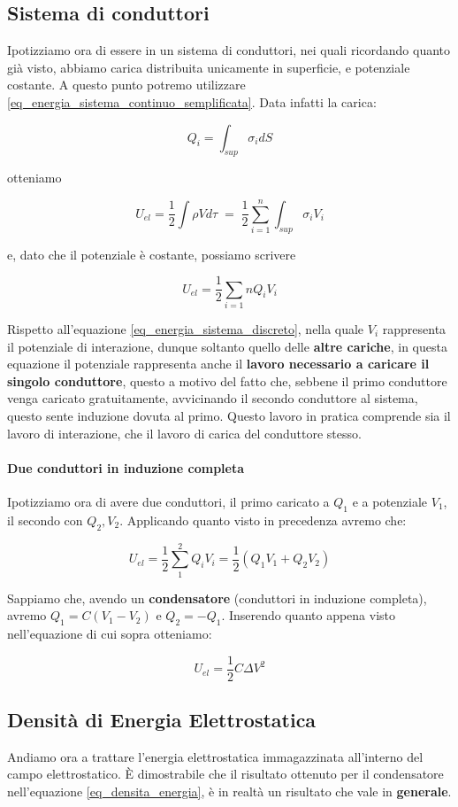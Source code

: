 \subsection{Sistema di conduttori}
Ipotizziamo ora di essere in un sistema di conduttori, nei quali ricordando quanto già visto, abbiamo carica distribuita unicamente in superficie, e potenziale costante. A questo punto potremo utilizzare \ref{eq_energia_sistema_continuo_semplificata}. Data infatti la carica: 

$$ Q_i = \int_{sup} \sigma_i dS $$ 

otteniamo

$$
	U_{el} = \frac{1}{2} \int \rho V d\tau \; = \; \frac{1}{2} \sum_{i=1}^n \int_{sup} \sigma_i V_i
$$

e, dato che il potenziale è costante, possiamo scrivere

\begin{equation} \label{eq_energia_sistema_conduttori}
	U_{el} = \frac{1}{2} \sum_{i=1}{n} Q_i V_i
\end{equation}

Rispetto all'equazione \ref{eq_energia_sistema_discreto}, nella quale $V_i$ rappresenta il potenziale di interazione, dunque soltanto quello delle \textbf{altre cariche}, in questa equazione il potenziale rappresenta anche il \textbf{lavoro necessario a caricare il singolo conduttore}, questo a motivo del fatto che, sebbene il primo conduttore venga caricato gratuitamente, avvicinando il secondo conduttore al sistema, questo sente induzione dovuta al primo. Questo lavoro in pratica comprende sia il lavoro di interazione, che il lavoro di carica del conduttore stesso.

\paragraph{Due conduttori in induzione completa} Ipotizziamo ora di avere due conduttori, il primo caricato a $Q_1$ e a potenziale $V_1$, il secondo con $Q_2, V_2$. Applicando quanto visto in precedenza avremo che: 

$$ U_{el} = \frac{1}{2} \sum_1^2 Q_iV_i = \frac{1}{2} \left(Q_1V_1 + Q_2V_2\right) $$

Sappiamo che, avendo un \textbf{condensatore} (conduttori in induzione completa), avremo $Q_1 = C(V_1 - V_2)$ e $Q_2 = -Q_1$. Inserendo quanto appena visto nell'equazione di cui sopra otteniamo: 

$$U_{el} = \frac{1}{2}C\Delta V^2$$

\subsection{Densità di Energia Elettrostatica}
Andiamo ora a trattare l'energia elettrostatica immagazzinata all'interno del campo elettrostatico. È dimostrabile che il risultato ottenuto per il condensatore nell'equazione \ref{eq_densita_energia}, è in realtà un risultato che vale in \textbf{generale}. 


